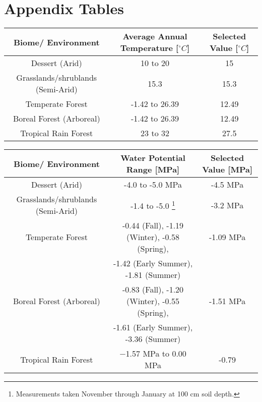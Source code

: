 \documentclass{article}
\begin{document}
\section{Appendix Tables}

\begin{table}[H]
\begin{center}
 \begin{tabular}{|c c c|} 
 \hline
 Biome/ Environment & Average Annual Temperature [$^{\circ}C$] & Selected Value [$^{\circ}C$]\\ [0.5ex] 
 \hline\hline
 Dessert (Arid) & 10 to 20 \cite{Davey2007} & 15 \\ 
 \hline
 Grasslands/shrublands (Semi-Arid) & 15.3 \cite{Pelaez1992} & 15.3 \\
 \hline
 Temperate Forest & -1.42 to 26.39 \cite{Zaz2018} & 12.49 \\
 \hline
 Boreal Forest (Arboreal)& -1.42 to 26.39 \cite{Zaz2018} & 12.49 \\
 \hline
 Tropical Rain Forest & 23 to 32 \cite{Paton2020} &27.5 \\
 \hline
\end{tabular}
\end{center}
\end{table}

 

\begin{savenotes}
\begin{table}[ht]
\begin{center}
 \begin{tabular}{|c c c|} 
 \hline
 Biome/ Environment & Water Potential Range [MPa] & Selected Value [MPa] \\ [0.5ex] 
 \hline\hline
 Dessert (Arid) & -4.0 to -5.0 MPa \cite{Nilsen1983} & -4.5 MPa \\ 
 \hline
 Grasslands/shrublands (Semi-Arid) & -1.4 to -5.0 \footnote{Measurements taken November through January at 100 cm soil depth.} \cite{Pelaez 1994} & -3.2 MPa\\
 \hline
 Temperate Forest & -0.44 (Fall), -1.19 (Winter), -0.58 (Spring), & -1.09 MPa\\
 &-1.42 (Early Summer), -1.81 (Summer) \cite{Zobel2001}&\\
 \hline
 Boreal Forest (Arboreal) & -0.83 (Fall), -1.20 (Winter), -0.55 (Spring),& -1.51 MPa\\
 &-1.61 (Early Summer), -3.36 (Summer) \cite{Zobel2001} &\\
 \hline
 Tropical Rain Forest & −1.57 MPa to 0.00 MPa  \cite{Kupers2018} & -0.79 \\ 
 \hline
\end{tabular}
\end{center}
\end{table}
\end{savenotes}

\newpage


\end{document}
